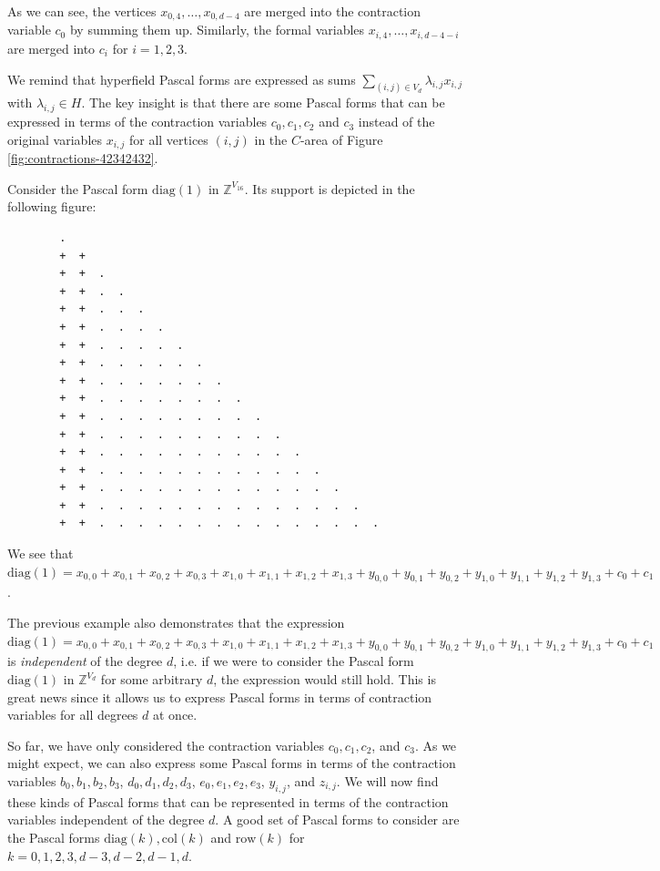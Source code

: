 As we can see, the vertices \( x_{0,4}, \dots, x_{0, d-4} \) are merged into the contraction variable \( c_0 \) by summing them up. Similarly, the formal variables \( x_{i,4}, \dots, x_{i,d-4-i} \) are merged into \( c_i \) for \( i = 1,2,3 \).

We remind that hyperfield Pascal forms are expressed as sums \( \sum_{(i,j) \in V_d} \lambda_{i,j} x_{i,j} \) with \( \lambda_{i,j} \in H \). The key insight is that there are some Pascal forms that can be expressed in terms of the contraction variables \( c_0 , c_1, c_2\) and \( c_3 \) instead of the original variables \( x_{i,j} \) for all vertices \( (i,j) \) in the \( C \)-area of Figure \ref{fig:contractions-42342432}.

\begin{example}
    Consider the Pascal form \( \mathrm{diag}(1) \) in \( \mathbb{Z}^{V_{16}} \). Its support is depicted in the following figure:
    \begin{verbatim}
        .
        +  +
        +  +  . 
        +  +  .  .  
        +  +  .  .  .  
        +  +  .  .  .  .  
        +  +  .  .  .  .  .  
        +  +  .  .  .  .  .  .  
        +  +  .  .  .  .  .  .  .
        +  +  .  .  .  .  .  .  .  .  
        +  +  .  .  .  .  .  .  .  .  .
        +  +  .  .  .  .  .  .  .  .  .  .
        +  +  .  .  .  .  .  .  .  .  .  .  .
        +  +  .  .  .  .  .  .  .  .  .  .  .  .
        +  +  .  .  .  .  .  .  .  .  .  .  .  .  .
        +  +  .  .  .  .  .  .  .  .  .  .  .  .  .  .
        +  +  .  .  .  .  .  .  .  .  .  .  .  .  .  .  .
    \end{verbatim}
    We see that \( \mathrm{diag}(1) = x_{0,0} + x_{0,1} + x_{0,2} + x_{0,3} + x_{1,0} + x_{1,1} + x_{1,2} + x_{1,3} + y_{0,0} + y_{0,1} + y_{0,2} + y_{1,0} + y_{1,1} + y_{1,2} + y_{1,3} + c_0 + c_1\).
\end{example}

The previous example also demonstrates that the expression \( \mathrm{diag}(1) = x_{0,0} + x_{0,1} + x_{0,2} + x_{0,3} + x_{1,0} + x_{1,1} + x_{1,2} + x_{1,3} + y_{0,0} + y_{0,1} + y_{0,2} + y_{1,0} + y_{1,1} + y_{1,2} + y_{1,3} + c_0 + c_1 \) is \emph{independent} of the degree \( d \), i.e. if we were to consider the Pascal form \( \mathrm{diag}(1) \) in \( \mathbb{Z}^{V_{d}} \) for some arbitrary \( d \), the expression would still hold. This is great news since it allows us to express Pascal forms in terms of contraction variables for all degrees \( d \) at once.

So far, we have only considered the contraction variables \( c_0, c_1, c_2 \), and \( c_3 \). As we might expect, we can also express some Pascal forms in terms of the contraction variables \( b_0, b_1, b_2, b_3 \), \( d_0, d_1, d_2, d_3 \), \( e_0, e_1, e_2, e_3 \), \( y_{i,j} \), and \( z_{i,j} \). We will now find these kinds of Pascal forms that can be represented in terms of the contraction variables independent of the degree \( d \). A good set of Pascal forms to consider are the Pascal forms \( \mathrm{diag}(k),  \mathrm{col}(k) \) and \( \mathrm{row}(k) \) for \( k = 0,1,2,3,d-3,d-2,d-1,d \).

